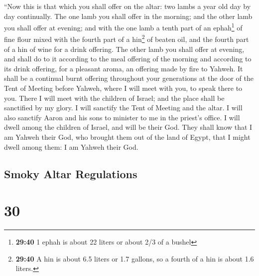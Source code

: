  ``Now this is that which you shall offer on the altar:
two lambs a year old day by day continually.  The one
lamb you shall offer in the morning; and the other lamb you shall offer
at evening;  and with the one lamb a tenth part of an
ephah\footnote{\textbf{29:40} 1 ephah is about 22 liters or about 2/3 of
  a bushel} of fine flour mixed with the fourth part of a hin\footnote{\textbf{29:40}
  A hin is about 6.5 liters or 1.7 gallons, so a fourth of a hin is
  about 1.6 liters.} of beaten oil, and the fourth part of a hin of wine
for a drink offering.  The other lamb you shall offer at
evening, and shall do to it according to the meal offering of the
morning and according to its drink offering, for a pleasant aroma, an
offering made by fire to Yahweh.  It shall be a continual
burnt offering throughout your generations at the door of the Tent of
Meeting before Yahweh, where I will meet with you, to speak there to
you.  There I will meet with the children of Israel; and
the place shall be sanctified by my glory.  I will
sanctify the Tent of Meeting and the altar. I will also sanctify Aaron
and his sons to minister to me in the priest's office.  I
will dwell among the children of Israel, and will be their God.
 They shall know that I am Yahweh their God, who brought
them out of the land of Egypt, that I might dwell among them: I am
Yahweh their God.

\hypertarget{smoky-altar-regulations}{%
\subsection{Smoky Altar Regulations}\label{smoky-altar-regulations}}

\hypertarget{section-29}{%
\section{30}\label{section-29}}

